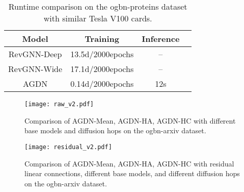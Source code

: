 \documentclass{article}
\begin{document}
\begin{table}[!hbt]
\caption{Runtime comparison on the ogbn-proteins dataset with similar Tesla V100 cards.}
\label{tab:runtime on ogbn-proteins}
\small
\begin{center}
    \begin{tabular}{c|ccc}
    \toprule
       \textbf{Model}  & \textbf{Training} & \textbf{Inference} \\
       \midrule
         RevGNN-Deep & 13.5d/2000epochs & – \\
         RevGNN-Wide & 17.1d/2000epochs & – \\
         AGDN & 0.14d/2000epochs & 12s \\
    \bottomrule
    \end{tabular}

\end{center}

\end{table}

\begin{figure}[htb]
    \centering
    \texttt{[image: raw\_v2.pdf]}
    \caption{Comparison of AGDN-Mean, AGDN-HA, AGDN-HC with different base models and diffusion hops on the ogbn-arxiv dataset.}
    \label{fig:raw}
\end{figure}

\begin{figure}[htb]
    \centering
    \texttt{[image: residual\_v2.pdf]}
    \caption{Comparison of AGDN-Mean, AGDN-HA, AGDN-HC with residual linear connections, different base models, and different diffusion hops on the ogbn-arxiv dataset.}
    \label{fig:residual}
\end{figure}
\end{document}
